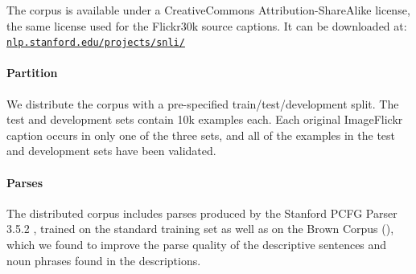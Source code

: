 The corpus is available under a CreativeCommons
Attribution-ShareAlike license, the same license used for the Flickr30k source captions. It can be downloaded at:\\\href{http://nlp.stanford.edu/projects/snli/}{\texttt{nlp.stanford.edu/projects/snli/}}

\paragraph{Partition} 

We distribute the corpus with a pre-specified train/test/development split. The test and development sets contain 10k examples each. Each original ImageFlickr caption occurs in only one of the three sets, and all of the examples in the test and development sets have been validated.

\paragraph{Parses}

The distributed corpus includes parses produced by the Stanford PCFG Parser 3.5.2 \cite{klein2003accurate}, trained on the standard training set as well as on the Brown Corpus (\citealt{francis1979brown}), which we found to improve the parse quality of the descriptive sentences and noun phrases found in the descriptions. 


